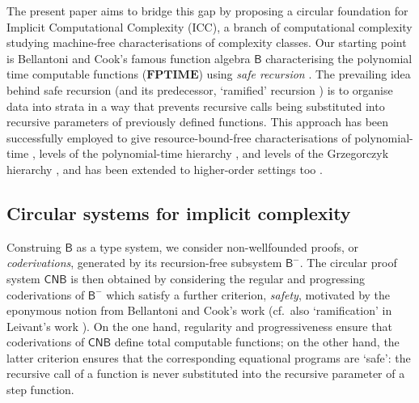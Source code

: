 \documentclass[manuscript,screen]{acmart}
\newcommand{\purple}[1]{{\color{purple}#1}}
\newcommand{\toappendix}[1]{\purple{#1}}
\theoremstyle{definition}
\theoremstyle{remark}
\newcommand{\n}{N}
\newcommand{\sq}{\Box}
\newcommand{\sqn}{{\sq\n}}
\newcommand{\sn}{\sqn}
\newcommand{\lists}[3]{{#2},\overset{#1}{\ldots},{#3} }
\newcommand{\ptime}{\mathbf{PTIME}}
\newcommand{\f}{\mathbf{F}}
\newcommand{\fptime}{\f\ptime}
\newcommand{\saferec}{\mathsf{srec}}
\newcommand{\bc}{\mathsf{B}}
\newcommand{\bcnorec}{\bc^{-}}
\newcommand{\nested}{\mathsf{N}}
\newcommand{\seqar}{\Rightarrow}
\newcommand{\cyclic}{\mathsf{C}}
\newcommand{\ncbc}{\cyclic\nested\bc}
\begin{document}
The present paper aims to bridge this gap by proposing a circular foundation for Implicit Computational Complexity (ICC), a branch of computational complexity studying machine-free characterisations of complexity classes. 
Our starting point is  Bellantoni and Cook's famous function algebra $\bc$ characterising the polynomial time computable  functions ($\fptime$) using \emph{safe recursion} \cite{BellantoniCook}. 
The prevailing idea behind safe recursion (and its predecessor, `ramified' recursion \cite{Leivant91}) is to organise data into strata in a way that prevents recursive calls being substituted into recursive parameters of previously defined functions.
This approach has been successfully employed to give resource-bound-free characterisations of polynomial-time \cite{BellantoniCook}, levels of the polynomial-time hierarchy \cite{Bellantoni-fph}, and levels of the Grzegorczyk hierarchy \cite{Wirz99characterizingthe}, and has been extended to higher-order settings too \cite{Hofmann97,Leivant99}.


\subsection*{Circular systems for implicit complexity}
Construing $\bc$ as a type system, we consider non-wellfounded proofs, or \emph{coderivations},   generated by its recursion-free subsystem $\bcnorec$. 
The circular  proof system  $\ncbc$ is then obtained by considering the regular and progressing coderivations of $\bcnorec$ which satisfy a further criterion, \emph{safety}, motivated by the eponymous notion from Bellantoni and Cook's work (cf.~also `ramification' in Leivant's work \cite{Leivant91}). 
On the one hand, regularity and progressiveness ensure that coderivations of $\ncbc$ define total computable functions; on the other hand, the latter criterion ensures that the corresponding equational programs are `safe': the recursive call of a function is never substituted into the recursive parameter of a step function.
    
\end{document}
